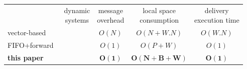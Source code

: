 \newcommand{\cmark}{\ding{51}}%
\newcommand{\xmark}{\ding{55}}%

\setlength{\tabcolsep}{3pt} %

\begin{tabularx}{0.98\columnwidth}{@{}Xcccc@{}}
  & \makecell{dynamic\\systems} & \makecell{message\\overhead} & \makecell{local space\\consumption} &  \makecell{delivery\\execution time} \\ \cmidrule{2-5}
  vector-based~\cite{schwarz1994detecting} & \cmark & $O(N)$ & $O(N+W.N)$ & $O(W.N)$ \\
  FIFO+forward~\cite{friedman2004causal} & \xmark & $O(1)$ & $O(P+ W)$ & $O(1)$ \\ \hline\hline
  \textbf{this paper} & \textbf{\cmark} & $\mathbf{O(1)}$ & $\mathbf{O(N+B+W)}$ & $\mathbf{O(1)}$ \\ 
\end{tabularx}

